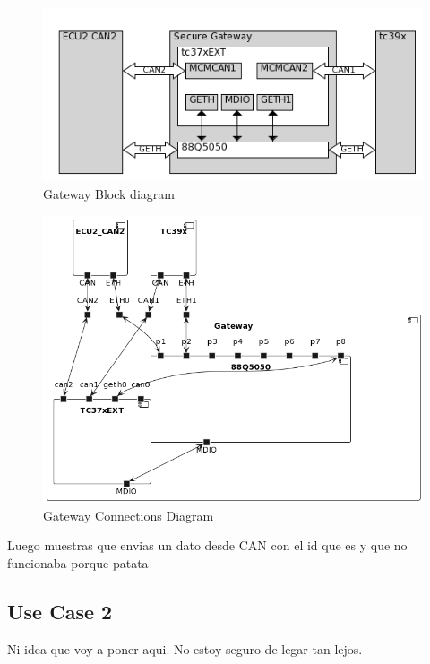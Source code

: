 \begin{figure}[!htb]
 \centering
 \includegraphics[width=\textwidth]{img/gateway_block_diagram.png}
 \caption{Gateway Block diagram}
 \label{fig:block diagram}
\end{figure}

\begin{figure}[!htb]
 \centering
 \includegraphics[width=\textwidth]{img/GWConnectionsDiagram.png}
 \caption{Gateway Connections Diagram}
 \label{fig:connections-diagram}
\end{figure}


Luego muestras que envias un dato desde CAN con el id que es y que no funcionaba porque patata

\subsection{Use Case 2}

Ni idea que voy a poner aqui. No estoy seguro de legar tan lejos.
